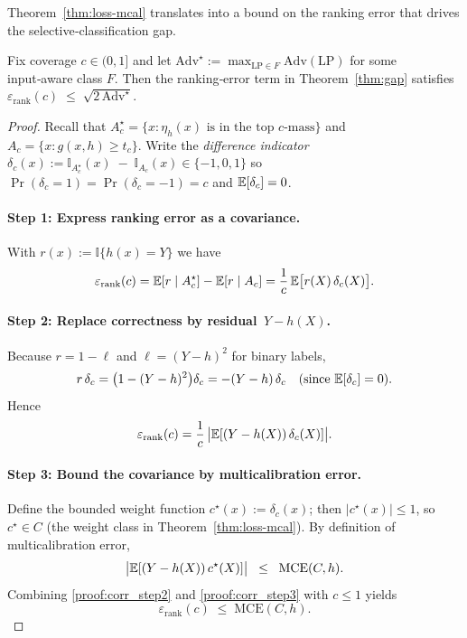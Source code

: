 Theorem~\ref{thm:loss-mcal} translates into a bound on the ranking error
that drives the selective‑classification gap.

\begin{corollary}
\label{cor:rank-bound}
Fix coverage \(c\in(0,1]\) and let
\(\mathrm{Adv}^{\star}:=\max_{\mathrm{LP}\in F}\mathrm{Adv}(\mathrm{LP})\)
for some input‑aware class \(F\).
Then the ranking‑error term in
Theorem~\ref{thm:gap}
satisfies
\(
\varepsilon_{\text{rank}}(c)
\;\le\;
\sqrt{2\,\mathrm{Adv}^{\star}}.
\)
\end{corollary}

\begin{proof}
Recall that
\(
A_c^{\star}
=\{x:\eta_h(x)\text{ is in the top }c\text{-mass}\}
\)
and
\(A_c
=\{x:g(x,h)\ge t_c\}\).
Write the \emph{difference indicator}
\(
\delta_c(x)
:=\mathbb{I}_{A_c^{\star}}(x)\;-\;\mathbb{I}_{A_c}(x)\in\{-1,0,1\}\) so 
\(\Pr(\delta_c=1)=\Pr(\delta_c=-1)=c\) and
\(\mathbb{E}[\delta_c]=0\).

\paragraph{Step 1:  Express ranking error as a covariance.}
With \(r(x):=\mathbb{I}\{h(x)=Y\}\) we have
\begin{equation}
\varepsilon_{\text{rank}}(c)
=\mathbb{E}[r\mid A_c^{\star}]-\mathbb{E}[r\mid A_c]
=\frac{1}{c}\,\mathbb{E}\bigl[r(X)\,\delta_c(X)\bigr].
\end{equation}

\paragraph{Step 2:  Replace correctness by residual \(\,Y-h(X)\).}
Because \(r=1-\ell\) and \(\ell=(Y-h)^2\) for binary labels,
\begin{equation}
r\,\delta_c
=\bigl(1-(Y-h)^2\bigr)\delta_c
=-(Y-h)\,\delta_c
\quad\text{(since }\mathbb{E}[\delta_c]=0\text{)}.
\end{equation}
Hence
\begin{equation}
\label{proof:corr_step2}
\varepsilon_{\text{rank}}(c)
=\frac{1}{c}\,
\bigl|\mathbb{E}[(Y-h(X))\,\delta_c(X)]\bigr|.
\end{equation}

\paragraph{Step 3:  Bound the covariance by multicalibration error.}
Define the bounded weight function \(c^{\star}(x):=\delta_c(x)\); then
\(|c^{\star}(x)|\le 1\), so \(c^{\star}\in C\) (the weight class in
Theorem~\ref{thm:loss-mcal}).  By definition of multicalibration error,
\begin{equation}
\label{proof:corr_step3}
\bigl|\mathbb{E}[(Y-h(X))\,c^{\star}(X)]\bigr|
\;\;\le\;\;
\mathrm{MCE}(C,h).
\end{equation}
Combining \eqref{proof:corr_step2} and \eqref{proof:corr_step3} with \(c\le 1\) yields
\begin{equation}
\varepsilon_{\text{rank}}(c)
\;\le\;
\mathrm{MCE}(C,h).
\end{equation}


\end{proof}
